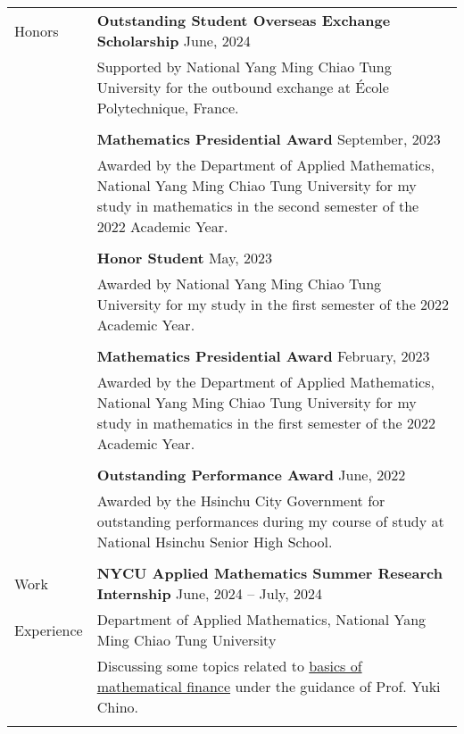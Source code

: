 \documentclass[letterpaper, 11pt]{article}
\begin{document}
\begin{center}
\begin{longtable}{p{0.74in}p{5.95in}}
        
        {\textcolor{OliveGreen}{Honors}} & \textbf{Outstanding Student Overseas Exchange Scholarship} \hfill June, 2024\\
        & Supported by National Yang Ming Chiao Tung University for the outbound exchange at \'Ecole Polytechnique, France. \\
        & \\
        & \textbf{Mathematics Presidential Award} \hfill September, 2023\\
        & Awarded by the Department of Applied Mathematics, National Yang Ming Chiao Tung University for my study in mathematics in the second semester of the 2022 Academic Year.\\
        & \\
        & \textbf{Honor Student} \hfill May, 2023\\
        & Awarded by National Yang Ming Chiao Tung University for my study in the first semester of the 2022 Academic Year. \\
        & \\
        & \textbf{Mathematics Presidential Award} \hfill February, 2023\\
        & Awarded by the Department of Applied Mathematics, National Yang Ming Chiao Tung University for my study in mathematics in the first semester of the 2022 Academic Year.\\
        & \\
        & \textbf{Outstanding Performance Award} \hfill June, 2022\\
        & Awarded by the Hsinchu City Government for outstanding performances during my course of study at National Hsinchu Senior High School.\\
        & \\
        
        
        {\textcolor{OliveGreen}{Work}} & \textbf{NYCU Applied Mathematics Summer Research Internship} \hfill June, 2024 -- July, 2024 \\
        {\textcolor{OliveGreen}{Experience}} & Department of Applied Mathematics, National Yang Ming Chiao Tung University \\
        & Discussing some topics related to \href{https://hackmd.io/@eiken-sc11/B1QcaW3B0}{basics of mathematical finance} under the guidance of Prof. Yuki Chino.\\
        & \\
        

\end{longtable}
\end{center}
\end{document}
